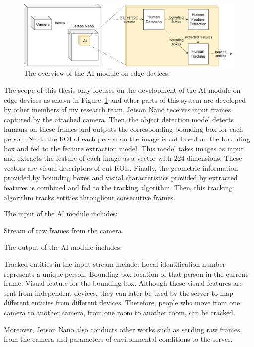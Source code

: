 \documentclass[../main.tex]{subfiles}
\begin{document}
\begin{figure}[h!]
\centering
\includegraphics[width=\linewidth]{Figure/edge_overview.pdf}
\caption{The overview of the AI module on edge devices.}
\label{fig:edge_overview}
\end{figure}

The scope of this thesis only focuses on the development of the AI module on edge devices as shown in Figure~\ref{fig:edge_overview} and other parts of this system are developed by other members of my research team. Jetson Nano receives input frames captured by the attached camera. Then, the object detection model detects humans on these frames and outputs the corresponding bounding box for each person. Next, the ROI of each person on the image is cut based on the bounding box and fed to the feature extraction model. This model takes images as input and extracts the feature of each image as a vector with $224$ dimensions. These vectors are visual descriptors of cut ROIs. Finally, the geometric information provided by bounding boxes and visual characteristics provided by extracted features is combined and fed to the tracking algorithm. Then, this tracking algorithm tracks entities throughout consecutive frames.

The input of the AI module includes:
\begin{outline}
 \1 Stream of raw frames from the camera.
\end{outline}

The output of the AI module includes:
\begin{outline}
 \1 Tracked entities in the input stream include:
    \2 Local identification number represents a unique person.
    \2 Bounding box location of that person in the current frame.
    \2 Visual feature for the bounding box. Although these visual features are sent from independent devices, they can later be used by the server to map different entities from different devices. Therefore, people who move from one camera to another camera, from one room to another room, can be tracked.
\end{outline}

Moreover, Jetson Nano also conducts other works such as sending raw frames from the camera and parameters of environmental conditions to the server.
\end{document}
